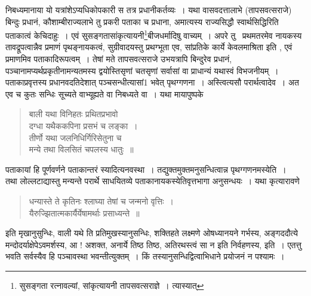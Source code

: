 \documentclass[11pt, openany]{book}
\begin{document}
\newpage

\noindent
निबध्यमानाया यो यत्रांशेऽप्यधिकोपकारी स तत्र प्रधानीकर्तव्यः~। यथा वासवदत्तालाभे (तापसवत्सराजे) बिन्दुः प्रधानं, कौशाम्बीराज्यलाभे तु प्रकरी पताका च प्रधाना, अमात्यस्य राज्यसिद्धौ स्वार्थसिद्धिरिति पताकात्वं केचिदाहुः~। एवं सुसङ्गतासांकृत्यायनी\renewcommand{\thefootnote}{*}\footnote{सुसङ्गता रत्नावल्यां, सांकृत्यायनी तापसवत्सराज्ञे~। त्यास्यात्}बीजधर्मादिषु वाच्यम्~। अपरे तु \textendash\ प्रथमतरमेव नायकस्य तावद्रूपत्वान्नैव प्रमाणं पृथङ्नायकत्वं, सुग्रीवादयस्तु प्रथग्भूता एव, सांप्रतिके कार्ये केवलमाश्रिता इति , एवं प्रमाणमिव पताकादिरूपत्वम्~। तेषां मते तापसवत्सराजे उभयत्रापि बिन्दुरेव प्रधानं, पञ्चानामप्यर्थप्रकृतीनामन्यतमस्य द्वयोस्तिसृणां चतसृणां सर्वासां वा प्राधान्यं यथास्वं विभजनीयम्~। पताकाप्रवृत्तस्य प्रधानवदतिदेशात् पञ्चसन्धीत्यासां1 भवेत् पृथग्गणना~। अस्त्वित्यसौ परार्थत्वादेव~। अत एव च कुतः सन्धिः सूच्यते वाभ्यूह्यते वा निबध्यते वा~। यथा मायापुष्पके \textendash

\begin{quote}
{\qt बाली यथा विनिहतः प्रथितप्रभावो\\
दग्धा यथैककपिना प्रसभं च लङ्का~।\\
तीर्णो यथा जलनिधिर्गिरिसेतुना च\\
मन्ये तथा विलसितं चपलस्य धातुः~॥}
\end{quote}

\noindent
पताकायां हि पूर्णवर्णने पताकान्तरं स्यादित्यनवस्था~। तद्युक्तमुक्तमनुसन्धित्वान्न पृथग्गणनमस्येति~।\\

तथा लोल्लटाद्यास्तु मन्यन्ते परार्थे साधयितव्ये पताकानायकस्येतिवृत्तभागा अनुसन्धयः~। यथा कृत्यारावणे \textendash

\begin{quote}
{\qt धन्यास्ते ते कृतिनः श्लाघ्या तेषां च जन्मनो वृत्तिः~।\\
यैरुज्झितात्मकार्यैर्येषामर्थाः प्रसाध्यन्ते~॥}
\end{quote}

\noindent
इति मृखानुसुन्धिः, {\qt वाली यथे} ति प्रतिमुखस्यानुसन्धिः, शक्तिहते लक्ष्मणे ओषध्यानयने गर्भस्य, अङ्गददौत्ये मन्दोदर्याक्षेपेऽवमर्शस्य, {\qt आ ! अशक्त, अनार्ये तिष्ठ तिष्ठ, अतिरथस्त्वं सा न} इति निर्वहणस्य, इति~। एतत्तु भवति सर्वस्यैव हि पञ्चावस्था भवन्तीत्युक्तम्~। किं तस्यानुसन्धिद्वित्वाभिधाने प्रयोजनं न पश्यामः~।


\newpage
\lfoot{}
\end{document}
